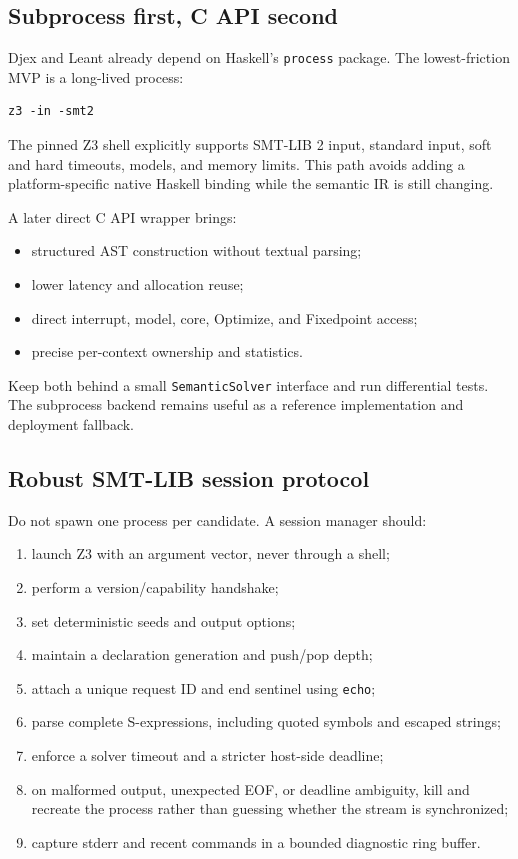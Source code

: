 \documentclass[11pt,oneside]{article}
\newcommand{\code}[1]{\texttt{#1}}
\begin{document}
\subsection{Subprocess first, C API second}

Djex and Leant already depend on Haskell's \code{process} package. The lowest-friction
MVP is a long-lived process:

\begin{lstlisting}
z3 -in -smt2
\end{lstlisting}

The pinned Z3 shell explicitly supports SMT-LIB 2 input, standard input, soft and hard
timeouts, models, and memory limits. This path avoids adding a platform-specific native
Haskell binding while the semantic IR is still changing.

A later direct C API wrapper brings:

\begin{itemize}
  \item structured AST construction without textual parsing;
  \item lower latency and allocation reuse;
  \item direct interrupt, model, core, Optimize, and Fixedpoint access;
  \item precise per-context ownership and statistics.
\end{itemize}

Keep both behind a small \code{SemanticSolver} interface and run differential tests.
The subprocess backend remains useful as a reference implementation and deployment
fallback.

\subsection{Robust SMT-LIB session protocol}

Do not spawn one process per candidate. A session manager should:

\begin{enumerate}
  \item launch Z3 with an argument vector, never through a shell;
  \item perform a version/capability handshake;
  \item set deterministic seeds and output options;
  \item maintain a declaration generation and push/pop depth;
  \item attach a unique request ID and end sentinel using \code{echo};
  \item parse complete S-expressions, including quoted symbols and escaped strings;
  \item enforce a solver timeout and a stricter host-side deadline;
  \item on malformed output, unexpected EOF, or deadline ambiguity, kill and recreate
        the process rather than guessing whether the stream is synchronized;
  \item capture stderr and recent commands in a bounded diagnostic ring buffer.
\end{enumerate}
\end{document}
